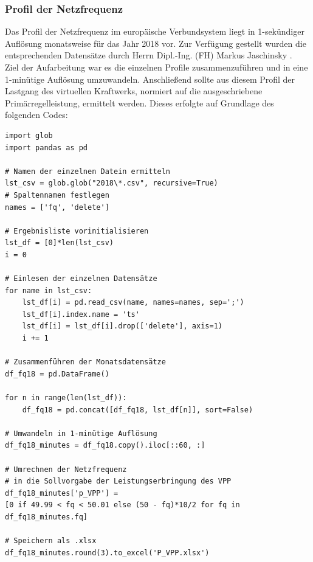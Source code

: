 \subsubsection{Profil der Netzfrequenz}

Das Profil der Netzfrequenz im europäische Verbundsystem liegt in 1-sekündiger Auflösung monatsweise für das Jahr 2018 vor. Zur Verfügung gestellt wurden die entsprechenden Datensätze durch Herrn Dipl.-Ing. (FH) Markus Jaschinsky \parencite{Jaschinsky18}.\medskip\\
Ziel der Aufarbeitung war es die einzelnen Profile zusammenzuführen und in eine 1-minütige Auflösung umzuwandeln. Anschließend sollte aus diesem Profil der Lastgang des virtuellen Kraftwerks, normiert auf die ausgeschriebene Primärregelleistung, ermittelt werden. Dieses erfolgte auf Grundlage des folgenden Codes:

\begin{code}
\label{code:VPP}
\begin{verbatim}
import glob
import pandas as pd

# Namen der einzelnen Datein ermitteln
lst_csv = glob.glob("2018\*.csv", recursive=True)
# Spaltennamen festlegen
names = ['fq', 'delete']

# Ergebnisliste vorinitialisieren
lst_df = [0]*len(lst_csv)
i = 0

# Einlesen der einzelnen Datensätze
for name in lst_csv:
    lst_df[i] = pd.read_csv(name, names=names, sep=';')
    lst_df[i].index.name = 'ts'
    lst_df[i] = lst_df[i].drop(['delete'], axis=1)
    i += 1
    
# Zusammenführen der Monatsdatensätze
df_fq18 = pd.DataFrame()

for n in range(len(lst_df)):
    df_fq18 = pd.concat([df_fq18, lst_df[n]], sort=False)
    
# Umwandeln in 1-minütige Auflösung
df_fq18_minutes = df_fq18.copy().iloc[::60, :]

# Umrechnen der Netzfrequenz
# in die Sollvorgabe der Leistungserbringung des VPP
df_fq18_minutes['p_VPP'] =
[0 if 49.99 < fq < 50.01 else (50 - fq)*10/2 for fq in df_fq18_minutes.fq]

# Speichern als .xlsx
df_fq18_minutes.round(3).to_excel('P_VPP.xlsx')
\end{verbatim}
\end{code}

\newpage